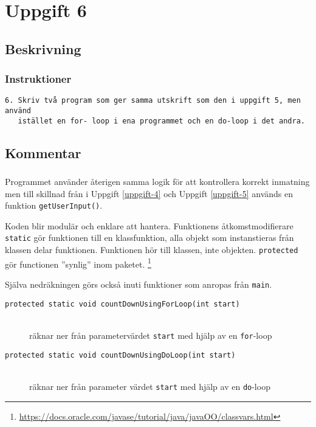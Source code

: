 \section{Uppgift 6}\label{uppgift-6}

\subsection{Beskrivning}
\subsubsection*{Instruktioner}
\begin{verbatim}
6. Skriv två program som ger samma utskrift som den i uppgift 5, men använd
   istället en for- loop i ena programmet och en do-loop i det andra.
\end{verbatim}

\subsection{Kommentar}
\subsubsection*{}
Programmet använder återigen samma logik för att kontrollera korrekt inmatning
men till skillnad från i Uppgift \ref{uppgift-4} och Uppgift \ref{uppgift-5}
används en funktion \texttt{getUserInput()}.
\par Koden blir modulär och enklare att hantera. Funktionens åtkomstmodifierare
\texttt{static} gör funktionen till en klassfunktion, alla objekt som
instanstieras från klassen delar funktionen. Funktionen hör till klassen, inte
objekten.
\texttt{protected} gör functionen ''synlig'' inom paketet.
\footnote{\url{https://docs.oracle.com/javase/tutorial/java/javaOO/classvars.html}}

\par Själva nedräkningen görs också inuti funktioner som anropas från
\texttt{main}.

\begin{description}
\item[\texttt{protected static void countDownUsingForLoop(int start)}] \hfill \\
räknar ner från parametervärdet \texttt{start} med hjälp av en \texttt{for}-loop

\item [\texttt{protected static void countDownUsingDoLoop(int start)}] \hfill \\
räknar ner från parameter värdet \texttt{start} med hjälp av en \texttt{do}-loop
\end{description}

